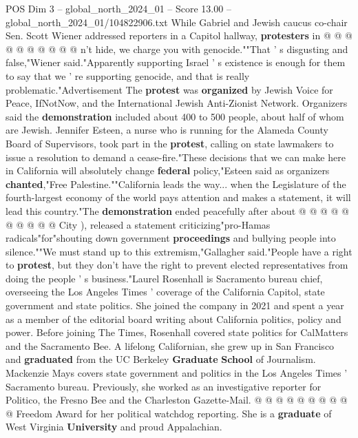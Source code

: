 \begin{textsample}{POS Dim 3 – global\_north\_2024\_01 – Score 13.00 – global\_north\_2024\_01/104822906.txt}
While Gabriel and Jewish caucus co-chair Sen.
Scott Wiener addressed reporters in a Capitol hallway, \textbf{protesters} in @ @ @ @ @ @ @ @ @ @ n't hide, we charge you with genocide.""That ' s disgusting and false,"Wiener said."Apparently supporting Israel ' s existence is enough for them to say that we ' re supporting genocide, and that is really problematic."Advertisement The \textbf{protest} was \textbf{organized} by Jewish Voice for Peace, IfNotNow, and the International Jewish Anti-Zionist Network.
Organizers said the \textbf{demonstration} included about 400 to 500 people, about half of whom are Jewish.
Jennifer Esteen, a nurse who is running for the Alameda County Board of Supervisors, took part in the \textbf{protest}, calling on state lawmakers to issue a resolution to demand a cease-fire."These decisions that we can make here in California will absolutely change \textbf{federal} policy,"Esteen said as organizers \textbf{chanted},"Free Palestine.""California leads the way... when the Legislature of the fourth-largest economy of the world pays attention and makes a statement, it will lead this country."The \textbf{demonstration} ended peacefully after about @ @ @ @ @ @ @ @ @ @ City ), released a statement criticizing"pro-Hamas radicals"for"shouting down government \textbf{proceedings} and bullying people into silence.""We must stand up to this extremism,"Gallagher said."People have a right to \textbf{protest}, but they don't have the right to prevent elected representatives from doing the people ' s business."Laurel Rosenhall is Sacramento bureau chief, overseeing the Los Angeles Times ' coverage of the California Capitol, state government and state politics.
She joined the company in 2021 and spent a year as a member of the editorial board writing about California politics, policy and power.
Before joining The Times, Rosenhall covered state politics for CalMatters and the Sacramento Bee.
A lifelong Californian, she grew up in San Francisco and \textbf{graduated} from the UC Berkeley \textbf{Graduate} \textbf{School} of Journalism.
Mackenzie Mays covers state government and politics in the Los Angeles Times ' Sacramento bureau.
Previously, she worked as an investigative reporter for Politico, the Fresno Bee and the Charleston Gazette-Mail. @ @ @ @ @ @ @ @ @ @ Freedom Award for her political watchdog reporting.
She is a \textbf{graduate} of West Virginia \textbf{University} and proud Appalachian.

\end{textsample}
